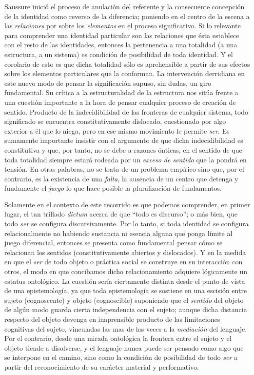 Saussure inició el proceso de anulación del referente y la consecuente concepción de la identidad como reverso de la diferencia; poniendo en el centro de la escena a las \emph{relaciones} por sobre los \emph{elementos} en el proceso significativo. Si lo relevante para comprender una identidad particular son las relaciones que ésta establece con el resto de las identidades, entonces la pertenencia a una totalidad (a una estructura, a un sistema) es condición de posibilidad de toda identidad. Y el corolario de esto es que dicha totalidad sólo es aprehensible a partir de sus efectos sobre los elementos particulares que la conforman. La intervención derridiana en este nuevo modo de pensar la significación supuso, sin dudas, un giro fundamental. Su crítica a la estructuralidad de la estructura nos sitúa frente a una cuestión importante a la hora de pensar cualquier proceso de creación de sentido. Producto de la indecidibilidad de las fronteras de cualquier sistema, todo significado se encuentra constitutivamente dislocado, cuestionado por algo exterior a él que lo niega, pero en ese mismo movimiento le permite \emph{ser}. Es sumamente importante insistir con el argumento de que dicha indecidibilidad es constitutiva y que, por tanto, no se debe a razones ónticas, en el sentido de que toda totalidad siempre estará rodeada por un \emph{exceso de sentido} que la pondrá en tensión. En otras palabras, no se trata de un problema empírico sino que, por el contrario, es la existencia de una \emph{falta}, la ausencia de un centro que detenga y fundamente el \emph{juego} lo que hace posible la pluralización de fundamentos.

Solamente en el contexto de este recorrido es que podemos comprender, en primer lugar, el tan trillado \emph{dictum} acerca de que ``todo es discurso''; o más bien, que todo \emph{ser }se configura discursivamente. Por lo tanto, si toda identidad se configura relacionalmente no habiendo sustancia ni esencia alguna que ponga límite al juego diferencial, entonces se presenta como fundamental pensar cómo se relacionan los sentidos (constitutivamente abiertos y dislocados). Y en la medida en que el \emph{ser} de todo objeto o práctica social se construye en su interacción con otros, el modo en que concibamos dicho relacionamiento adquiere lógicamente un estatus ontológico. La cuestión sería ciertamente distinta desde el punto de vista de una epistemología, ya que toda epistemología se sostiene en una escisión entre sujeto (cognoscente) y objeto (cognoscible) suponiendo que el \emph{sentido }del objeto de algún modo guarda cierta independencia con el sujeto; aunque dicha distancia respecto del objeto devenga en inaprensible producto de las limitaciones cognitivas del sujeto, vinculadas las mas de las veces a la \emph{mediación} del lenguaje. Por el contrario, desde una mirada ontológica la frontera entre el sujeto y el objeto tiende a disolverse, y el lenguaje nunca puede ser pensado como algo que se interpone en el camino, sino como la condición de posibilidad de todo \emph{ser} a partir del reconocimiento de su carácter material y performativo.

